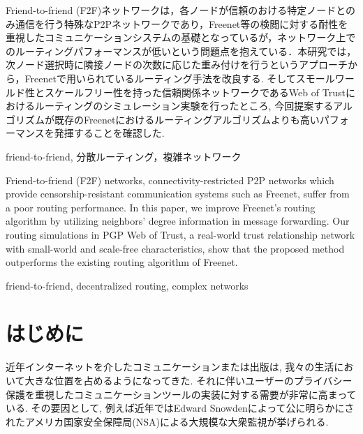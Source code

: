 \documentclass[technicalreport]{./ieicej-v3.0/UTF/ieicej}
\begin{document}
\begin{jabstract}
Friend-to-friend (F2F)ネットワークは，各ノードが信頼のおける特定ノードとのみ通信を行う特殊なP2Pネットワークであり，Freenet等の検閲に対する耐性を重視したコミュニケーションシステムの基礎となっているが，ネットワーク上でのルーティングパフォーマンスが低いという問題点を抱えている．本研究では，次ノード選択時に隣接ノードの次数に応じた重み付けを行うというアプローチから，Freenetで用いられているルーティング手法を改良する. そしてスモールワールド性とスケールフリー性を持った信頼関係ネットワークであるWeb of Trustにおけるルーティングのシミュレーション実験を行ったところ, 今回提案するアルゴリズムが既存のFreenetにおけるルーティングアルゴリズムよりも高いパフォーマンスを発揮することを確認した. 
\end{jabstract}
\begin{jkeyword}
friend-to-friend, 分散ルーティング，複雑ネットワーク
\end{jkeyword}
\begin{eabstract}
Friend-to-friend (F2F) networks, connectivity-restricted P2P networks which provide censorship-resistant communication systems such as Freenet, suffer from a poor routing performance. In this paper, we improve Freenet's routing algorithm by utilizing neighbors' degree information in message forwarding. Our routing simulations in PGP Web of Trust, a real-world trust relationship network with small-world and scale-free characteristics, show that the proposed method outperforms the existing routing algorithm of Freenet.
\end{eabstract}
\begin{ekeyword}
friend-to-friend, decentralized routing, complex networks
\end{ekeyword}
\maketitle

\section{はじめに}
近年インターネットを介したコミュニケーションまたは出版は, 我々の生活において大きな位置を占めるようになってきた. それに伴いユーザーのプライバシー保護を重視したコミュニケーションツールの実装に対する需要が非常に高まっている. その要因として, 例えば近年ではEdward Snowdenによって公に明らかにされたアメリカ国家安全保障局(NSA)による大規模な大衆監視が挙げられる.
\end{document}
